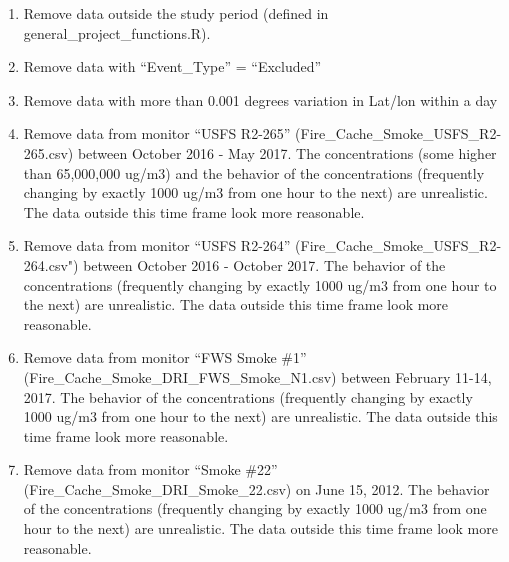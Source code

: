 \begin{enumerate}[nolistsep]
\begin{enumerate}[nolistsep]
	\item Remove data outside the study period (defined in general\_project\_functions.R).
	\item Remove data with ``Event\_Type'' = ``Excluded''
	\item Remove data with more than 0.001 degrees variation in Lat/lon within a day
	\item Remove data from monitor ``USFS R2-265'' (Fire\_Cache\_Smoke\_USFS\_R2-265.csv) between October 2016 - May 2017. The concentrations (some higher than 65,000,000 ug/m3) and the behavior of the concentrations (frequently changing by exactly 1000 ug/m3 from one hour to the next) are unrealistic. The data outside this time frame look more reasonable.
	\item Remove data from monitor ``USFS R2-264'' (Fire\_Cache\_Smoke\_USFS\_R2-264.csv") between October 2016 - October 2017. The behavior of the concentrations (frequently changing by exactly 1000 ug/m3 from one hour to the next) are unrealistic. The data outside this time frame look more reasonable.
	\item Remove data from monitor ``FWS Smoke \#1'' (Fire\_Cache\_Smoke\_DRI\_FWS\_Smoke\_N1.csv) between February 11-14, 2017. The behavior of the concentrations (frequently changing by exactly 1000 ug/m3 from one hour to the next) are unrealistic. The data outside this time frame look more reasonable.
	\item Remove data from monitor ``Smoke \#22'' (Fire\_Cache\_Smoke\_DRI\_Smoke\_22.csv) on June 15, 2012. The behavior of the concentrations (frequently changing by exactly 1000 ug/m3 from one hour to the next) are unrealistic. The data outside this time frame look more reasonable.



\end{enumerate}
\end{enumerate}
